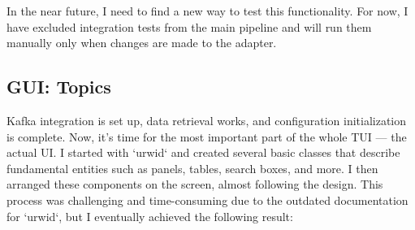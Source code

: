 \documentclass[10pt , a4paper]{report}
\begin{document}
In the near future, I need to find a new way to test this functionality. For now, I have excluded integration tests from the main pipeline and will run them manually only when changes are made to the adapter.

\subsection{GUI: Topics}

Kafka integration is set up, data retrieval works, and configuration initialization is complete. Now, it's time for the most important part of the whole TUI — the actual UI. I started with `urwid` and created several basic classes that describe fundamental entities such as panels, tables, search boxes, and more. I then arranged these components on the screen, almost following the design. This process was challenging and time-consuming due to the outdated documentation for `urwid`, but I eventually achieved the following result:
\end{document}
